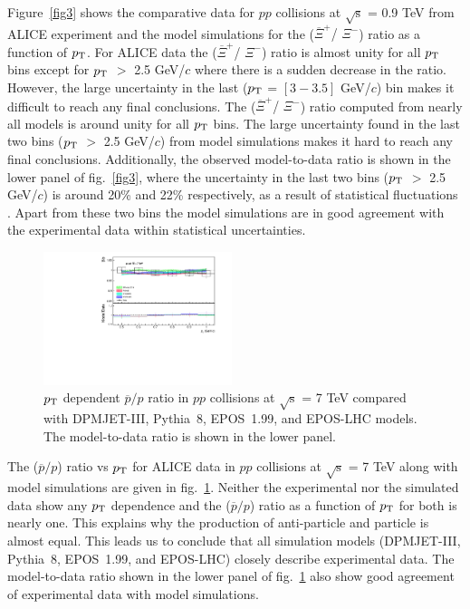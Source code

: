 \documentclass{article}
\newcommand{\sqrts}{\mbox{$\sqrt{\mathrm{s}}$}}
\newcommand{\axi}{$\overline{\Xi}^+$}
\newcommand{\xim}{$\Xi^-$}
\newcommand{\ppt}{$p_{\rm T}$}
\begin{document}
Figure~\ref{fig3} shows the comparative data for $pp$ collisions at {\sqrts} = 0.9 TeV from ALICE experiment and the model simulations for the ({\axi / \xim}) ratio as a function of {\ppt}. For ALICE data the ({\axi / \xim}) ratio is almost unity for all {\ppt} bins except for {\ppt} $>$ 2.5 GeV/$c$ where there is a sudden decrease in the ratio. However, the large uncertainty in the last ({\ppt} = $[3-3.5]$ GeV/$c$) bin makes it difficult to reach any final conclusions. The ({\axi / \xim}) ratio computed from nearly all models is around unity for all {\ppt} bins.  The large uncertainty found in the last two bins ({\ppt} $>$ 2.5 GeV/$c$) from model simulations makes it hard to reach any final conclusions. Additionally, the observed model-to-data ratio is shown in the lower panel of fig.~\ref{fig3}, where the uncertainty in the last two bins ({\ppt} $>$ 2.5 GeV/$c$) is around 20\% and 22\% respectively, as a result of statistical fluctuations . Apart from these two bins the model simulations are in good agreement with the experimental data within statistical uncertainties.    


\begin{figure}[!ht]
\centering
\includegraphics[width=0.49\textwidth,height=0.35\textheight]{pap_pt_7000.pdf}
\caption{{\ppt} dependent $\overline{p}/p$ ratio in $pp$ collisions at {\sqrts} = 7 TeV compared with  DPMJET-III, Pythia~8, EPOS~1.99, and EPOS-LHC models. The model-to-data ratio is shown in the lower panel. }
\label{fig4}
\end{figure}

The ($\overline{p}/p$) ratio vs {\ppt} for ALICE data in $pp$ collisions at {\sqrts} = 7 TeV along with model simulations are given in fig.~\ref{fig4}. Neither the experimental nor the simulated data show any {\ppt} dependence and the ($\overline{p}/p$) ratio as a function of {\ppt} for both is nearly one. This explains why the production of anti-particle and particle is almost equal. This leads us to conclude that   
all simulation models (DPMJET-III, Pythia~8, EPOS~1.99, and EPOS-LHC) closely describe experimental data. The model-to-data ratio shown in the lower panel of fig.~\ref{fig4} also show good agreement of experimental data with model simulations.
\end{document}
